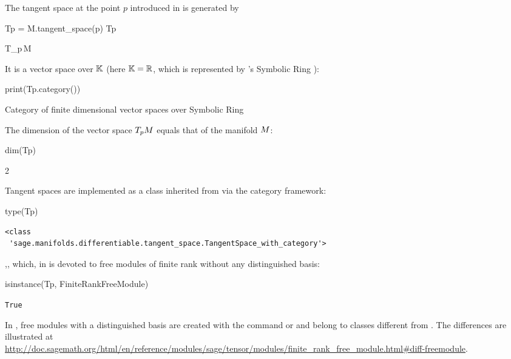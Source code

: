 The tangent space at the point $p$ introduced in  is generated by
\begin{NBin}
Tp = M.tangent_space(p)
Tp
\end{NBin}
\begin{NBoutM}
T_{p}\,M
\end{NBoutM}
It is a vector space over $\mathbb{K}$ (here $\mathbb{K}=\mathbb{R}$, which is represented by \Sage{}'s Symbolic
Ring ):
\begin{NBin}
print(Tp.category())
\end{NBin}
\begin{NBprint}
Category of finite dimensional vector spaces over Symbolic Ring
\end{NBprint}
The dimension of the vector space $T_pM$ equals that of the manifold $M$:
\begin{NBin}
dim(Tp)
\end{NBin}
\begin{NBoutM}
2
\end{NBoutM}
Tangent spaces are implemented as a class inherited from 
via the category framework:
\begin{NBin}
type(Tp)
\end{NBin}
\begin{NBout}
\begin{verbatim}
<class
 'sage.manifolds.differentiable.tangent_space.TangentSpace_with_category'>
\end{verbatim}
\end{NBout}
,, which, in \Sage{} is devoted to free modules of finite rank
without any distinguished basis:
\begin{NBin}
isinstance(Tp, FiniteRankFreeModule)
\end{NBin}
\begin{NBout}
\texttt{True}
\end{NBout}
\begin{remark}
In \Sage{}, free modules with a distinguished basis
are created with the command  or 
and belong to classes different from .
The differences are illustrated at\\
{\scriptsize \url{http://doc.sagemath.org/html/en/reference/modules/sage/tensor/modules/finite_rank_free_module.html#diff-freemodule}}.
\end{remark}

